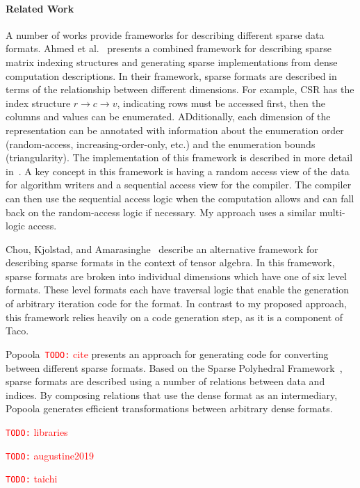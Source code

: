 \documentclass{article}
\newcommand{\todo}[1]{{\textcolor{red}{{\tt{TODO:}}\,\,#1 }}}
\newcommand{\nc}[0]{\todo{cite}}
\begin{document}
\paragraph{Related Work}

A number of works provide frameworks for describing different sparse data formats. 
Ahmed et al.~\cite{ahmed2000framework} presents a combined framework for describing sparse matrix indexing structures and generating sparse implementations from dense computation descriptions.
In their framework, sparse formats are described in terms of the relationship between different dimensions. For example, CSR has the index structure $r \rightarrow c \rightarrow v$, indicating rows must be accessed first, then the columns and values can be enumerated.
ADditionally, each dimension of the representation can be annotated with information about the enumeration order (random-access, increasing-order-only, etc.) and the enumeration bounds (triangularity).
The implementation of this framework is described in more detail in~\cite{mateev2000next}.
A key concept in this framework is having a random access view of the data for algorithm writers and a sequential access view for the compiler.
The compiler can then use the sequential access logic when the computation allows and can fall back on the random-access logic if necessary. 
My approach uses a similar multi-logic access.

Chou, Kjolstad, and Amarasinghe~\cite{chou2018format} describe an alternative framework for describing sparse formats in the context of tensor algebra. 
In this framework, sparse formats are broken into individual dimensions which have one of six level formats. 
These level formats each have traversal logic that enable the generation of arbitrary iteration code for the format.
In contrast to my proposed approach, this framework relies heavily on a code generation step, as it is a component of Taco.

Popoola~\nc presents an approach for generating code for converting between different sparse formats.
Based on the Sparse Polyhedral Framework~\cite{strout2018sparse}, sparse formats are described using a number of relations between data and indices. 
By composing relations that use the dense format as an intermediary, Popoola generates efficient transformations between arbitrary dense formats.

\todo{libraries}




\todo{augustine2019}

\todo{taichi}
\end{document}
